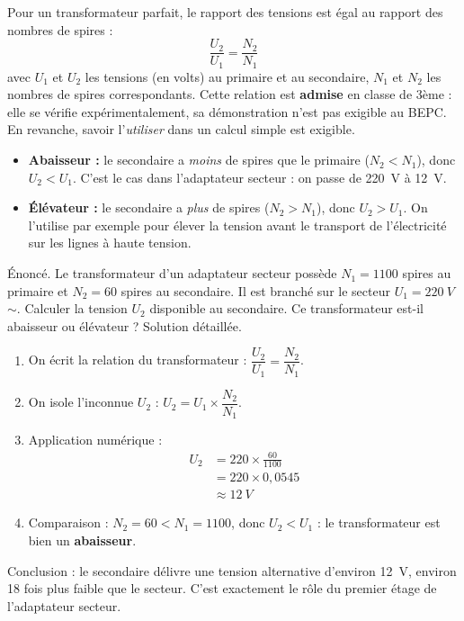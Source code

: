 \documentclass[11pt]{article}
\begin{document}
\begin{propriete}
Pour un transformateur parfait, le rapport des tensions est égal au rapport des nombres de spires :
\[ \frac{U_2}{U_1} = \frac{N_2}{N_1} \]
avec $U_1$ et $U_2$ les tensions (en volts) au primaire et au secondaire, $N_1$ et $N_2$ les nombres de spires correspondants. Cette relation est \textbf{admise} en classe de 3ème : elle se vérifie expérimentalement, sa démonstration n'est pas exigible au BEPC. En revanche, savoir l'\emph{utiliser} dans un calcul simple est exigible.
\end{propriete}

\begin{exemplebox}
\begin{itemize}
\item \textbf{Abaisseur :} le secondaire a \emph{moins} de spires que le primaire ($N_2 < N_1$), donc $U_2 < U_1$. C'est le cas dans l'adaptateur secteur : on passe de \SI{220}{V} à \SI{12}{V}.
\item \textbf{Élévateur :} le secondaire a \emph{plus} de spires ($N_2 > N_1$), donc $U_2 > U_1$. On l'utilise par exemple pour élever la tension avant le transport de l'électricité sur les lignes à haute tension.
\end{itemize}
\end{exemplebox}

\begin{exoresolu}
Énoncé. Le transformateur d'un adaptateur secteur possède $N_1 = 1100$ spires au primaire et $N_2 = 60$ spires au secondaire. Il est branché sur le secteur $U_1 = \SI{220}{V}$ $\sim$. Calculer la tension $U_2$ disponible au secondaire. Ce transformateur est-il abaisseur ou élévateur ?
\tcblower
Solution détaillée.
\begin{enumerate}
\item On écrit la relation du transformateur : $\dfrac{U_2}{U_1} = \dfrac{N_2}{N_1}$.
\item On isole l'inconnue $U_2$ : $U_2 = U_1 \times \dfrac{N_2}{N_1}$.
\item Application numérique :
\begin{align*}
U_2 &= 220 \times \frac{60}{1100} \\
&= 220 \times 0,0545 \\
&\approx \SI{12}{V}
\end{align*}
\item Comparaison : $N_2 = 60 < N_1 = 1100$, donc $U_2 < U_1$ : le transformateur est bien un \textbf{abaisseur}.
\end{enumerate}
Conclusion : le secondaire délivre une tension alternative d'environ \SI{12}{V}, environ 18 fois plus faible que le secteur. C'est exactement le rôle du premier étage de l'adaptateur secteur.
\end{exoresolu}
\end{document}
